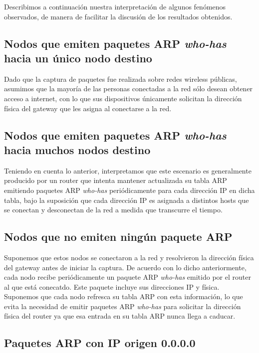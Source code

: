 \documentclass[a4paper, 10pt, twoside]{article}
\begin{document}
Describimos a continuación nuestra interpretación de algunos fenómenos observados, de manera de facilitar la discusión de los resultados obtenidos.


\subsection{Nodos que emiten paquetes ARP \textit{who-has} hacia un único nodo destino}

Dado que la captura de paquetes fue realizada sobre redes wireless públicas, asumimos que la mayoría de las personas conectadas a la red sólo desean obtener acceso a internet, con lo que sus dispositivos únicamente solicitan la dirección física del gateway que les asigna al conectarse a la red.


\subsection{Nodos que emiten paquetes ARP \textit{who-has} hacia muchos nodos destino}

Teniendo en cuenta lo anterior, interpretamos que este escenario es generalmente producido por un router que intenta mantener actualizada su tabla ARP emitiendo paquetes ARP \textit{who-has} periódicamente para cada dirección IP en dicha tabla, bajo la suposición que cada dirección IP es asignada a distintos hosts que se conectan y desconectan de la red a medida que transcurre el tiempo.


\subsection{Nodos que no emiten ningún paquete ARP}

Suponemos que estos nodos se conectaron a la red y resolvieron la dirección física del gateway antes de iniciar la captura. De acuerdo con lo dicho anteriormente, cada nodo recibe periódicamente un paquete ARP \textit{who-has} emitido por el router al que está conecatdo. Este paquete incluye sus direcciones IP y física. Suponemos que cada nodo refresca su tabla ARP con esta información, lo que evita la necesidad de emitir paquetes ARP \textit{who-has} para solicitar la dirección física del router ya que esa entrada en su tabla ARP nunca llega a caducar.


\subsection{Paquetes ARP con IP origen 0.0.0.0}
\end{document}
